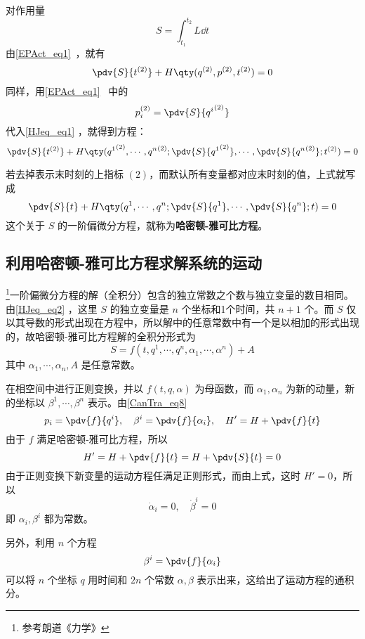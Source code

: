 
\begin{issues}
\issueTODO
\end{issues}


对作用量
\begin{equation}
S=\int_{t_1}^{t_2}L\dd t
\end{equation}
由\autoref{EPAct_eq1}~，就有
\begin{equation}\label{HJeq_eq1}
\pdv{S}{t^{(2)}}+H\qty(q^{(2)},p^{(2)},t^{(2)})=0
\end{equation}
同样，用\autoref{EPAct_eq1}~ 中的
\begin{equation}
p_i^{(2)}=\pdv{S}{{q^i}^{(2)}}
\end{equation}
代入\autoref{HJeq_eq1} ，就得到方程：
\begin{equation}
\pdv{S}{t^{(2)}}+H\qty({q^1}^{(2)},\cdots,{q^n}^{(2)};\pdv{S}{{q^1}^{(2)}},\cdots,\pdv{S}{{q^n}^{(2)}};t^{(2)})=0
\end{equation}

若去掉表示末时刻的上指标 $(2)$，而默认所有变量都对应末时刻的值，上式就写成
\begin{equation}\label{HJeq_eq2}
\pdv{S}{t}+H\qty({q^1},\cdots,{q^n};\pdv{S}{{q^1}},\cdots,\pdv{S}{{q^n}};t)=0
\end{equation}
这个关于 $S$ 的一阶偏微分方程，就称为\textbf{哈密顿-雅可比方程}。
\subsection{利用哈密顿-雅可比方程求解系统的运动}
\footnote{参考朗道《力学》}一阶偏微分方程的解（全积分）包含的独立常数之个数与独立变量的数目相同。由\autoref{HJeq_eq2} ，这里 $S$ 的独立变量是 $n$ 个坐标和1个时间，共 $n+1$ 个。而 $S$ 仅以其导数的形式出现在方程中，所以解中的任意常数中有一个是以相加的形式出现的，故哈密顿-雅可比方程解的全积分形式为
\begin{equation}
S=f(t,q^1,\cdots,q^n,\alpha_1,\cdots,\alpha^n)+A
\end{equation}
其中 $\alpha_1,\cdots,\alpha_n,A$ 是任意常数。

在相空间中进行正则变换，并以 $f(t,q,\alpha)$ 为母函数，而 $\alpha_1,\alpha_n$ 为新的动量，新的坐标以 $\beta^1,\cdots,\beta^n$ 表示。由\autoref{CanTra_eq8}~
\begin{equation}
p_i=\pdv{f}{q^i},\quad \beta^i=\pdv{f}{\alpha_i},\quad H'=H+\pdv{f}{t}
\end{equation}
由于 $f$ 满足哈密顿-雅可比方程，所以
\begin{equation}
H'=H+\pdv{f}{t}=H+\pdv{S}{t}=0
\end{equation}
由于正则变换下新变量的运动方程任满足正则形式，而由上式，这时 $H'=0$，所以
\begin{equation}
\dot\alpha_i=0,\quad\dot\beta^i=0
\end{equation}
即 $\alpha_i,\beta^i$ 都为常数。

另外，利用 $n$ 个方程
\begin{equation}
\beta^i=\pdv{f}{\alpha_i}
\end{equation}
可以将 $n$ 个坐标 $q$ 用时间和 $2n$ 个常数 $\alpha,\beta$ 表示出来，这给出了运动方程的通积分。